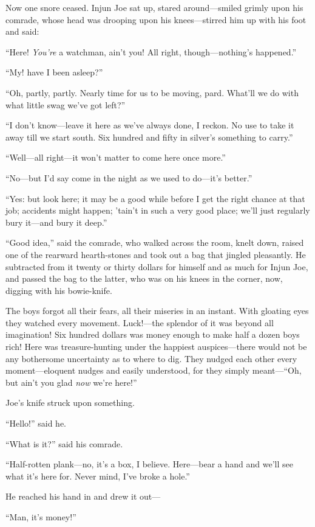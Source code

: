 \documentclass{book}
\begin{document}
Now one snore ceased. Injun Joe sat up, stared around—smiled grimly upon his comrade, whose head was drooping upon his knees—stirred him up with his foot and said:

“Here! \emph{You’re} a watchman, ain’t you! All right, though—nothing’s happened.”

“My! have I been asleep?”

“Oh, partly, partly. Nearly time for us to be moving, pard. What’ll we do with what little swag we’ve got left?”

“I don’t know—leave it here as we’ve always done, I reckon. No use to take it away till we start south. Six hundred and fifty in silver’s something to carry.”

“Well—all right—it won’t matter to come here once more.”

“No—but I’d say come in the night as we used to do—it’s better.”

“Yes: but look here; it may be a good while before I get the right chance at that job; accidents might happen; ’tain’t in such a very good place; we’ll just regularly bury it—and bury it deep.”

“Good idea,” said the comrade, who walked across the room, knelt down, raised one of the rearward hearth-stones and took out a bag that jingled pleasantly. He subtracted from it twenty or thirty dollars for himself and as much for Injun Joe, and passed the bag to the latter, who was on his knees in the corner, now, digging with his bowie-knife.

The boys forgot all their fears, all their miseries in an instant. With gloating eyes they watched every movement. Luck!—the splendor of it was beyond all imagination! Six hundred dollars was money enough to make half a dozen boys rich! Here was treasure-hunting under the happiest auspices—there would not be any bothersome uncertainty as to where to dig. They nudged each other every moment—eloquent nudges and easily understood, for they simply meant—“Oh, but ain’t you glad \emph{now} we’re here!”

Joe’s knife struck upon something.

“Hello!” said he.

“What is it?” said his comrade.

“Half-rotten plank—no, it’s a box, I believe. Here—bear a hand and we’ll see what it’s here for. Never mind, I’ve broke a hole.”

He reached his hand in and drew it out—

“Man, it’s money!”
\end{document}
